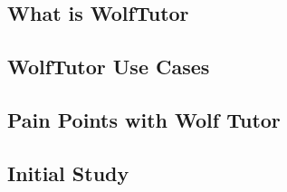 \subsection{What is WolfTutor}
\label{sec:what-wolftutor}


\subsection{WolfTutor Use Cases}
\label{sec:wolftutor-use-cases}


\subsection{Pain Points with Wolf Tutor}
\label{sec:pain-points-with}

\subsection{Initial Study}
\label{sec:initial-study}

